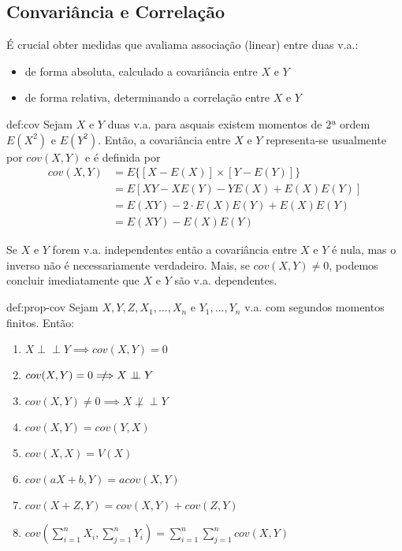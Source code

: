 \subsection[3.3 Convariância e Correlação]{\hspace*{0.075 em}\raisebox{0.2 em}{$\pmb{\drsh}$} Convariância e Correlação}

\noindent É crucial obter medidas que avaliama associação (linear) entre duas v.a.:
\begin{itemize}
    \item de forma absoluta, calculado a covariância entre $X$ e $Y$
    \item de forma relativa, determinando a correlação entre $X$ e $Y$
\end{itemize}

\begin{theo}{def:cov}\label{def:cov}
    \noindent Sejam $X$ e $Y$ duas v.a. para asquais existem momentos de 2ª ordem $E(X^2)$ e $E(Y^2)$. Então, a covariância entre $X$ e $Y$ representa-se usualmente por $cov(X,Y)$ e é definida por
    \begin{align*}
        cov(X,Y) &= E\{[X - E(X)] \times [Y - E(Y)]\}\\
        &= E[XY - XE(Y) - YE(X) + E(X)E(Y)]\\
        &= E(XY) - 2\cdot E(X)E(Y) + E(X)E(Y)\\
        &= E(XY) - E(X)E(Y)
    \end{align*}
\end{theo}

\noindent Se $X$ e $Y$ forem v.a. independentes então a covariância entre $X$ e $Y$ é nula, mas o inverso não é necessariamente verdadeiro. Mais, se $cov(X,Y) \ne 0$, podemos concluir imediatamente que $X$ e $Y$ são v.a. dependentes.

\begin{theo}{def:prop-cov}\label{def:prop-cov}
    \noindent Sejam $X,Y,Z, X_1, \dots, X_n$ e $Y_1, \dots, Y_n$ v.a. com segundos momentos finitos. Então:
    \begin{enumerate}
        \item $X\perp \!\!\! \perp Y \implies cov(X,Y) = 0$ 
        \item $cov(X,Y) = 0 \mathrel{\rlap{\hskip .5em/}}\Longrightarrow X\perp \!\!\! \perp Y$
        \item $cov(X,Y) \ne 0 \implies X \not\perp \!\!\! \perp Y$
        \item $cov(X,Y) = cov(Y,X)$
        \item $cov(X,X) = V(X)$
        \item $cov(aX + b, Y) = acov(X,Y)$
        \item $cov(X + Z,Y) = cov(X,Y) + cov(Z,Y)$
        \item $cov(\sum_{i = 1}^{n}X_i, \sum_{j = 1}^{n}Y_i) = \sum_{i = 1}^{n}\sum_{j = 1}^{n} cov(X,Y)$
    \end{enumerate}
\end{theo}

